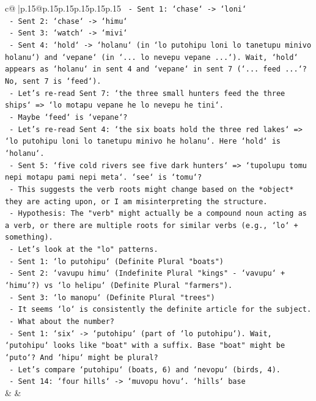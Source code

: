 \documentclass{article}
\begin{document}
{\begin{supertabular}{c@{$\;$}|p{.15\linewidth}@{}p{.15\linewidth}p{.15\linewidth}p{.15\linewidth}p{.15\linewidth}p{.15\linewidth}}
{{{\texttt{   {-} Sent 1: `chase` {-}> `loni`} \\
\texttt{   {-} Sent 2: `chase` {-}> `himu`} \\
\texttt{   {-} Sent 3: `watch` {-}> `mivi`} \\
\texttt{   {-} Sent 4: `hold` {-}> `holanu` (in `lo putohipu loni lo tanetupu minivo holanu`) and `vepane` (in `... lo nevepu vepane ...`). Wait, `hold` appears as `holanu` in sent 4 and `vepane` in sent 7 (`... feed ...`? No, sent 7 is `feed`).} \\
\texttt{   {-} Let's re{-}read Sent 7: `the three small hunters feed the three ships` => `lo motapu vepane he lo nevepu he tini`.} \\
\texttt{   {-} Maybe `feed` is `vepane`?} \\
\texttt{   {-} Let's re{-}read Sent 4: `the six boats hold the three red lakes` => `lo putohipu loni lo tanetupu minivo he holanu`. Here `hold` is `holanu`.} \\
\texttt{   {-} Sent 5: `five cold rivers see five dark hunters` => `tupolupu tomu nepi motapu pami nepi meta`. `see` is `tomu`?} \\
\texttt{   {-} This suggests the verb roots might change based on the *object* they are acting upon, or I am misinterpreting the structure.} \\
\texttt{   {-} Hypothesis: The "verb" might actually be a compound noun acting as a verb, or there are multiple roots for similar verbs (e.g., `lo` + something).} \\
\texttt{   {-} Let's look at the "lo" patterns.} \\
\texttt{   {-} Sent 1: `lo putohipu` (Definite Plural "boats")} \\
\texttt{   {-} Sent 2: `vavupu himu` (Indefinite Plural "kings" {-} `vavupu` + `himu`?) vs `lo helipu` (Definite Plural "farmers").} \\
\texttt{   {-} Sent 3: `lo manopu` (Definite Plural "trees")} \\
\texttt{   {-} It seems `lo` is consistently the definite article for the subject.} \\
\texttt{   {-} What about the number?} \\
\texttt{   {-} Sent 1: `six` {-}> `putohipu` (part of `lo putohipu`). Wait, `putohipu` looks like "boat" with a suffix. Base "boat" might be `puto`? And `hipu` might be plural?} \\
\texttt{   {-} Let's compare `putohipu` (boats, 6) and `nevopu` (birds, 4).} \\
\texttt{   {-} Sent 14: `four hills` {-}> `muvopu hovu`. `hills` base} \\
            }
        }
    }
    & & \\ \\


\end{supertabular}}
\end{document}
